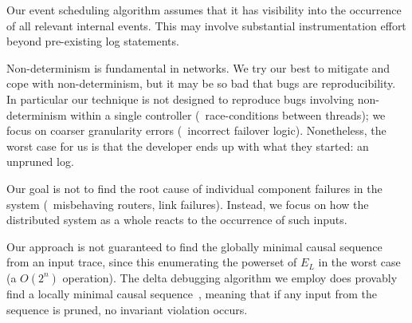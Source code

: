  Our event scheduling algorithm assumes that
it has visibility into the occurrence of all relevant internal events. This
may involve substantial instrumentation effort beyond
pre-existing log statements.

 Non-determinism
is fundamental in networks. We try our best to mitigate and cope with
non-determinism, but it may be so bad that bugs are reproducibility. In
particular our technique is not designed to reproduce bugs
involving non-determinism within a single controller (\eg~race-conditions between threads);
we focus on coarser granularity errors (\eg~incorrect failover logic). Nonetheless, the
worst case for us is that the developer ends up with what they started:
an unpruned log.




 Our goal is not to find the root
cause of individual component failures in the system (\eg~misbehaving routers,
link failures). Instead, we focus on
how the distributed system as a whole reacts to the occurrence of such inputs.

Our approach is not guaranteed to find the globally minimal
causal sequence from an input trace, since this enumerating the powerset of
$E_L$ in the worst case (a $O(2^n)$ operation).
The delta debugging algorithm we employ does provably find a
locally minimal causal sequence~\cite{Zeller:1999:YMP:318773.318946},
meaning that if any input from the sequence is pruned, no invariant violation
occurs.

